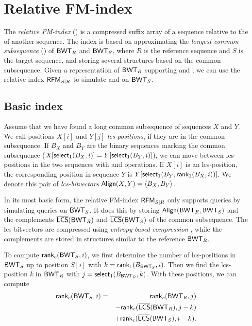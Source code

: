 

\section{Relative FM-index}

The \emph{relative FM-index} (\RFM) \cite{Belazzougui2014} is a compressed
suffix array of a sequence relative to the \CSA{} of another sequence.
The index is based on approximating the
\emph{longest common subsequence} (\LCS) of $\mathsf{BWT}_{R}$ and $\mathsf{BWT}_{S}$,
where $R$ is the reference sequence and $S$ is the target sequence, and
storing several structures based on the common subsequence. Given a
representation of $\mathsf{BWT}_{R}$ supporting \rank{} and \select{}, we can use the
relative index $\mathsf{RFM}_{S \mid R}$ to simulate \rank{} and \select{} on
$\mathsf{BWT}_{S}$.

\subsection{Basic index}

Assume that we have found a long common subsequence of sequences $X$ and $Y$.
We call positions $X[i]$ and $Y[j]$ \emph{lcs-positions}, if they are in the
common subsequence. If $B_{X}$ and $B_{Y}$ are the binary sequences marking
the common subsequence ($X[\textsf{select}_1(B_{X},i)] = Y[\textsf{select}_1(B_{Y},i)]$), we
can move between lcs-positions in the two sequences with \rank{} and \select{}
operations. If $X[i]$ is an lcs-position, the corresponding position in
sequence $Y$ is $Y[\mathsf{select}_{1}(B_{Y}, \mathsf{rank}_{1}(B_{X}, i))]$. We denote this
pair of \emph{lcs-bitvectors} $\mathsf{Align}(X,Y) = \langle B_X,B_Y \rangle$.

In its most basic form, the relative FM-index $\mathsf{RFM}_{S \mid R}$ only supports
\find{} queries by simulating \rank{} queries on $\mathsf{BWT}_{S}$. It does this by
storing $\mathsf{Align}(\textsf{BWT}_{R},\textsf{BWT}_{S})$ and the complements $\overline{ \mathsf{LCS} }(\mathsf{BWT}_{R})$ and
$\overline{ \mathsf{LCS} }(\mathsf{BWT}_{S})$ of the common subsequence. The lcs-bitvectors are compressed
using \emph{entropy-based compression} \cite{Raman2007}, while the complements
are stored in structures similar to the reference $\mathsf{BWT}_{R}$.

To compute $\mathsf{rank}_{c}(\mathsf{BWT}_{S}, i)$, we first determine the number of
lcs-positions in $\mathsf{BWT}_{S}$ up to position $S[i]$ with $k =
\mathsf{rank}_{1}(B_{\mathsf{BWT}_{S}}, i)$. Then we find the lcs-position $k$ in $\mathsf{BWT}_{R}$
with $j = \mathsf{select}_{1}(B_{\mathsf{BWT}_{R}}, k)$. With these positions, we can compute
\begin{eqnarray*}
\mathsf{rank}_{c}(\mathsf{BWT}_{S}, i) &=& \mathsf{rank}_{c}(\mathsf{BWT}_{R}, j) \\
   && - \mathsf{rank}_{c}(\overline{ \mathsf{LCS} }(\mathsf{BWT}_{R}),j-k) \\
   && + \mathsf{rank}_{c}(\overline{ \mathsf{LCS} }(\mathsf{BWT}_{S}), i-k).
\end{eqnarray*}

